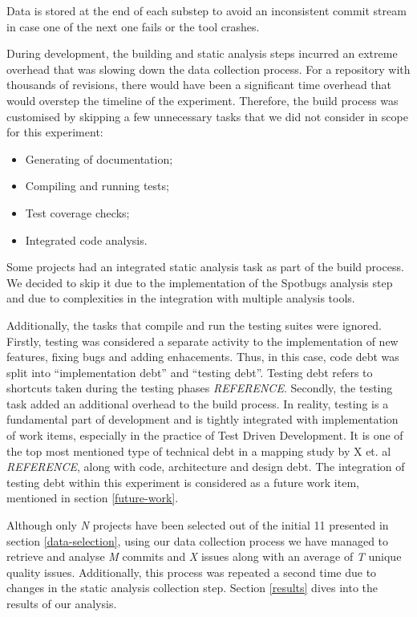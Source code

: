 \documentclass{mpaper}
\begin{document}
Data is stored at the end of each substep to avoid an inconsistent commit stream
in case one of the next one fails or the tool crashes.

During development, the building and static analysis steps incurred an extreme
overhead that was slowing down the data collection process. For a repository
with thousands of revisions, there would have been a significant time overhead
that would overstep the timeline of the experiment. Therefore, the build process
was customised by skipping a few unnecessary tasks that we did not consider in
scope for this experiment:

\begin{itemize}
  \item Generating of documentation;
  \item Compiling and running tests;
  \item Test coverage checks;
  \item Integrated code analysis.
\end{itemize}

Some projects had an integrated static analysis task as part of the build
process. We decided to skip it due to the implementation of the Spotbugs
analysis step and due to complexities in the integration with multiple analysis
tools. 

Additionally, the tasks that compile and run the testing suites were ignored.
Firstly, testing was considered a separate activity to the implementation of new
features, fixing bugs and adding enhacements. Thus, in this case, code debt was
split into ``implementation debt'' and ``testing debt''. Testing debt refers to
shortcuts taken during the testing phases \emph{REFERENCE}. Secondly, the
testing task added an additional overhead to the build process. In reality,
testing is a fundamental part of development and is tightly integrated with
implementation of work items, especially in the practice of Test Driven
Development. It is one of the top most mentioned type of technical debt in a
mapping study by X et. al \emph{REFERENCE}, along with code, architecture and
design debt. The integration of testing debt within this experiment is
considered as a future work item, mentioned in section \ref{future-work}.

Although only \emph{N} projects have been selected out of the initial 11
presented in section \ref{data-selection}, using our data collection process we
have managed to retrieve and analyse \emph{M} commits and \emph{X} issues along
with an average of \emph{T} unique quality issues. Additionally, this process
was repeated a second time due to changes in the static analysis collection
step. Section \ref{results} dives into the results of our analysis. 
\end{document}
